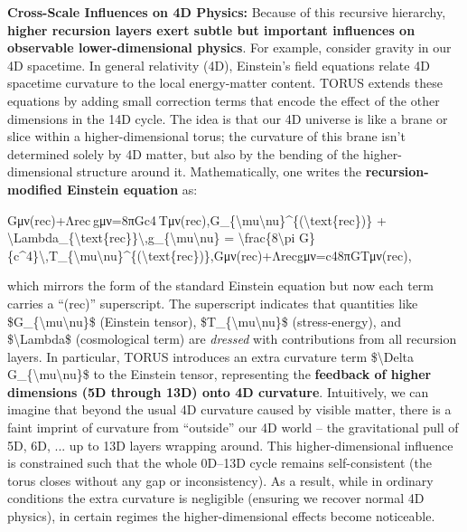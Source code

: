\textbf{Cross-Scale Influences on 4D Physics:} Because of this recursive
hierarchy, \textbf{higher recursion layers exert subtle but important
influences on observable lower-dimensional physics}. For example,
consider gravity in our 4D spacetime. In general relativity (4D),
Einstein's field equations relate 4D spacetime curvature to the local
energy-matter content. TORUS extends these equations by adding small
correction terms that encode the effect of the other dimensions in the
14D cycle. The idea is that our 4D universe is like a brane or slice
within a higher-dimensional torus; the curvature of this brane isn't
determined solely by 4D matter, but also by the bending of the
higher-dimensional structure around it. Mathematically, one writes the
\textbf{recursion-modified Einstein equation} as:

Gμν(rec)+Λrec gμν=8πGc4 Tμν(rec),G\_\{\textbackslash{}mu\textbackslash{}nu\}\^{}\{(\textbackslash{}text\{rec\})\}
+
\textbackslash{}Lambda\_\{\textbackslash{}text\{rec\}\}\textbackslash{},g\_\{\textbackslash{}mu\textbackslash{}nu\}
= \textbackslash{}frac\{8\textbackslash{}pi
G\}\{c\^{}4\}\textbackslash{},T\_\{\textbackslash{}mu\textbackslash{}nu\}\^{}\{(\textbackslash{}text\{rec\})\},Gμν(rec)​+Λrec​gμν​=c48πG​Tμν(rec)​,

which mirrors the form of the standard Einstein equation but now each
term carries a ``(rec)'' superscript​. The superscript indicates that
quantities like \$G\_\{\textbackslash{}mu\textbackslash{}nu\}\$
(Einstein tensor), \$T\_\{\textbackslash{}mu\textbackslash{}nu\}\$
(stress-energy), and \$\textbackslash{}Lambda\$ (cosmological term) are
\emph{dressed} with contributions from all recursion layers​. In
particular, TORUS introduces an extra curvature term
\$\textbackslash{}Delta G\_\{\textbackslash{}mu\textbackslash{}nu\}\$ to
the Einstein tensor, representing the \textbf{feedback of higher
dimensions (5D through 13D) onto 4D curvature}​. Intuitively, we can
imagine that beyond the usual 4D curvature caused by visible matter,
there is a faint imprint of curvature from ``outside'' our 4D world --
the gravitational pull of 5D, 6D, ... up to 13D layers wrapping around.
This higher-dimensional influence is constrained such that the whole
0D--13D cycle remains self-consistent (the torus closes without any gap
or inconsistency). As a result, while in ordinary conditions the extra
curvature is negligible (ensuring we recover normal 4D physics), in
certain regimes the higher-dimensional effects become noticeable.

